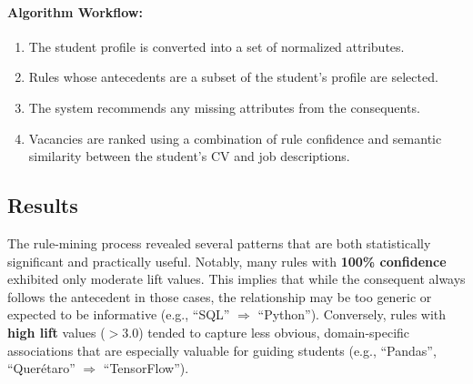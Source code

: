 \documentclass[runningheads]{llncs}
\begin{document}
	
	
	\vspace{0.5em}
	
	
	\paragraph{Algorithm Workflow:}
	\begin{enumerate}
		\item The student profile is converted into a set of normalized attributes.
		\item Rules whose antecedents are a subset of the student's profile are selected.
		\item The system recommends any missing attributes from the consequents.
		\item Vacancies are ranked using a combination of rule confidence and semantic similarity between the student's CV and job descriptions.
	\end{enumerate}
	
	\subsection{Results}
	
	The rule-mining process revealed several patterns that are both statistically significant and practically useful. Notably, many rules with \textbf{100\% confidence} exhibited only moderate lift values. This implies that while the consequent always follows the antecedent in those cases, the relationship may be too generic or expected to be informative (e.g., “SQL” $\Rightarrow$ “Python”). Conversely, rules with \textbf{high lift} values ($> 3.0$) tended to capture less obvious, domain-specific associations that are especially valuable for guiding students (e.g., “Pandas”, “Querétaro” $\Rightarrow$ “TensorFlow”).
	
\end{document}

